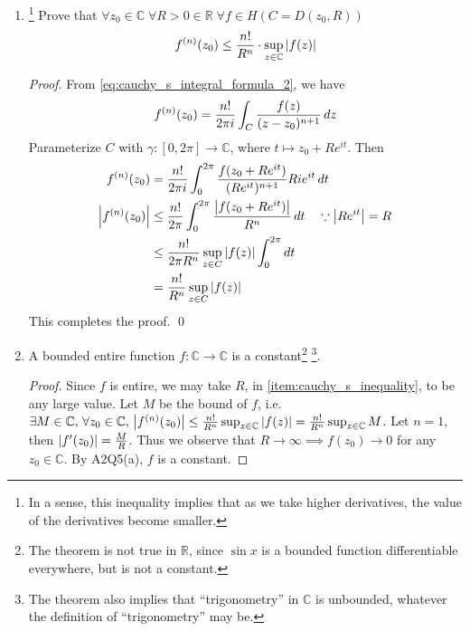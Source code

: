 \documentclass[11pt, oneside]{book}
\begin{document}
\begin{ex}\label{ex:applications_of_cauchy_s_integral_formula}
	\begin{enumerate}
		\item {}\footnote{In a sense, this inequality implies that as we take higher derivatives, the value of the derivatives become smaller.} Prove that $\forall z_0 \in \mathbb{C} \; \forall R > 0 \in \mathbb{R} \; \forall f \in H(C = D(z_0, R))$ \label{item:cauchy_s_inequality}
			\begin{equation*}
				f^{(n)}(z_0) \leq \frac{n!}{R^n} \cdot \sup_{z \in \mathbb{C}} \left|f(z)\right|
			\end{equation*}

			\begin{proof}
				From \cref{eq:cauchy_s_integral_formula_2}, we have
				\begin{equation*}
					f^{(n)}(z_0) = \frac{n!}{2 \pi i} \int_{C} \frac{f(z)}{(z - z_0)^{n + 1}} \mathop{}\!d{z} 
				\end{equation*}
				Parameterize $C$ with $\gamma: [0, 2 \pi] \to \mathbb{C}$, where $t \mapsto z_0 + Re^{it}$. Then
				\begin{align*}
					f^{(n)} (z_0) &= \frac{n!}{2 \pi i} \int_{0}^{2 \pi} \frac{f(z_0 + Re^{it})}{(Re^{it})^{n + 1}} Rie^{it} \mathop{}\!d{t} \\
					\left|f^{(n)}(z_0)\right| &\leq \frac{n!}{2 \pi} \int_{0}^{2 \pi} \frac{\left|f(z_0 + Re^{it})\right|}{R^n} \mathop{}\!d{t} \quad \because \left|Re^{it}\right| = R \\
						&\leq \frac{n!}{2 \pi R^n} \sup_{z \in C} \left|f(z)\right| \int_{0}^{2\pi} \mathop{}\!d{t} \\
						&= \frac{n!}{R^n} \sup_{z \in C} \left|f(z)\right|
				\end{align*}
				This completes the proof. \qed
			\end{proof}

		\item {} A bounded entire function $f: \mathbb{C} \to \mathbb{C}$ is a constant\footnote{The theorem is not true in $\mathbb{R}$, since $\sin x$ is a bounded function differentiable everywhere, but is not a constant.} \footnote{The theorem also implies that ``trigonometry'' in $\mathbb{C}$ is unbounded, whatever the definition of ``trigonometry'' may be.}.\label{item:liouville_s_theorem}

			\begin{proof}
				Since $f$ is entire, we may take $R$, in \cref{item:cauchy_s_inequality}, to be any large value. Let $M$ be the bound of $f$, i.e. $\exists M \in \mathbb{C}, \, \forall z_0 \in \mathbb{C}, \, \left|f^{(n)}(z_0)\right| \leq \frac{n!}{R^n} \sup_{z \in \mathbb{C}} \left|f(z)\right| = \frac{n!}{R^n} \sup_{z \in \mathbb{C}} M$. Let $n = 1$, then $\left|f'(z_0)\right| = \frac{M}{R}$. Thus we observe that $R \to \infty \implies f(z_0) \to 0$ for any $z_0 \in \mathbb{C}$. By A2Q5(a), $f$ is a constant.
			\end{proof}


\end{enumerate}
\end{ex}
\end{document}
